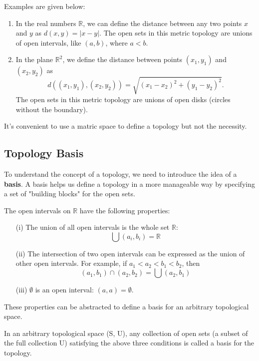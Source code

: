 \documentclass{article}
\begin{document}
Examples are given below:
\begin{enumerate}
    \item In the real numbers $\mathbb{R}$, we can define the distance between any two points $x$ and $y$ as $d(x, y) = |x - y|$. The open sets in this metric topology are unions of open intervals, like $(a, b)$, where $a < b$.

    \item In the plane $\mathbb{R}^2$, we define the distance between points $(x_1, y_1)$ and $(x_2, y_2)$ as
    \[
    d((x_1, y_1), (x_2, y_2)) = \sqrt{(x_1 - x_2)^2 + (y_1 - y_2)^2}.
    \]
    The open sets in this metric topology are unions of open disks (circles without the boundary).
\end{enumerate}

It's convenient to use a matric space to define a topology but not the necessity.

\subsection{Topology Basis} 

To understand the concept of a topology, we need to introduce the idea of a \textbf{basis}. A basis helps us define a topology in a more manageable way by specifying a set of "building blocks" for the open sets.

The open intervals on \(\mathbb{R}\) have the following properties:
\begin{itemize}
    \item[(i)] The union of all open intervals is the whole set \(\mathbb{R}\):
    \[
    \bigcup (a_i, b_i) = \mathbb{R}
    \]
    \item[(ii)] The intersection of two open intervals can be expressed as the union of other open intervals. For example, if \(a_1 < a_2 < b_1 < b_2\), then
    \[
    (a_1, b_1) \cap (a_2, b_2) = \bigcup (a_2, b_1)
    \]
    \item[(iii)] \(\emptyset\) is an open interval: \((a, a) = \emptyset\).
\end{itemize}
These properties can be abstracted to define a basis for an arbitrary topological space. 

\begin{theorem}
  In an arbitrary topological space (S, U), any collection of open sets
(a subset of the full collection U) satisfying the above three conditions is called
a basis for the topology.

\end{theorem}
\end{document}
